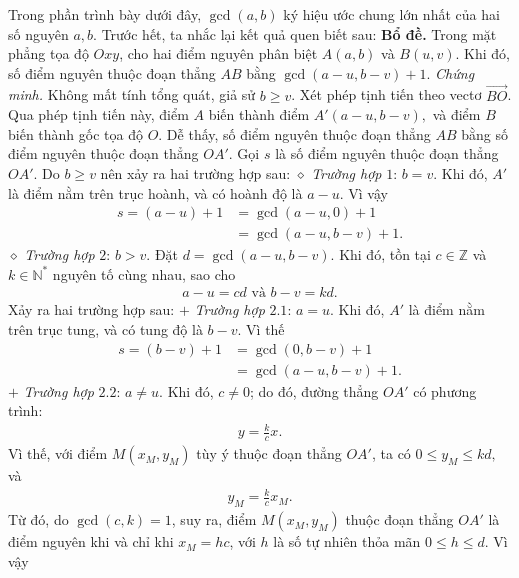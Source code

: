 \begin{multicols}{2}
	\vskip 0.05cm
	Trong phần trình bày dưới đây, $\gcd(a, b)$ ký hiệu ước chung lớn nhất của hai số nguyên $a, b$.\vskip 0.05cm
	Trước hết, ta nhắc lại kết quả quen biết sau:
	\vskip 0.05cm
	\textbf{\color{thachthuctoanhoc}Bổ đề.} Trong mặt phẳng tọa độ $Oxy$, cho hai điểm nguyên phân biệt $A(a, b)$ và $B(u, v)$. Khi đó, số điểm nguyên thuộc đoạn thẳng $AB$ bằng $\gcd(a - u, b - v) + 1$.
	\vskip 0.05cm
	\textit{Chứng minh.}
	\vskip 0.05cm
	Không mất tính tổng quát, giả sử $b \ge  v$.
	\vskip 0.05cm
	Xét phép tịnh tiến theo vectơ $\overrightarrow{BO}$. Qua phép tịnh tiến này, điểm $A$ biến thành điểm $A'\left( {a - u,b - v} \right),$  và điểm $B$ biến thành gốc tọa độ $O$. Dễ thấy, số điểm nguyên thuộc đoạn thẳng $AB$ bằng số điểm nguyên thuộc đoạn thẳng $OA'$.
	\vskip 0.05cm 
	Gọi $s$ là số điểm nguyên thuộc đoạn thẳng $OA'$.
	\vskip 0.05cm
	Do $b \ge  v$ nên xảy ra hai trường hợp sau:
	\vskip 0.05cm
	$\diamond$ \textit{Trường hợp} $1$: $b = v$.
	\vskip 0.05cm
	Khi đó, $A'$  là điểm nằm trên trục hoành, và có hoành độ là $a - u$. Vì vậy
	\begin{align*}
		s = (a - u) + 1 &= \gcd(a - u, 0) + 1 \\
		&= \gcd(a - u, b - v) + 1.
	\end{align*}
	$\diamond$ \textit{Trường hợp} $2$: $b > v$.
	\vskip 0.05cm
	Đặt $d = \gcd(a - u, b - v)$.
	\vskip 0.05cm
	Khi đó, tồn tại $c\in \mathbb{Z}$  và $k \in \mathbb{N^*}$  nguyên tố cùng nhau, sao cho
	\begin{align*}
		a - u = cd \text{ và } b - v = kd.
	\end{align*}
	Xảy ra hai trường hợp sau:
	\vskip 0.05cm
	$+$ \textit{Trường hợp} $2.1$: $a = u$.
	\vskip 0.05cm
	Khi đó, $A'$  là điểm nằm trên trục tung, và có tung độ là $b - v$. Vì thế
	\begin{align*}
		s = (b - v) + 1 &= \gcd(0, b - v) + 1 \\
		&= \gcd(a - u, b - v) + 1.
	\end{align*}
	$+$ \textit{Trường hợp} $2.2$: $a \ne u$.
	\vskip 0.05cm
	Khi đó, $c \ne 0$; do đó, đường thẳng $OA'$  có phương trình:
	\begin{align*}
		y = \frac{k}{c}x.
	\end{align*}
	Vì thế, với điểm $M\left( {{x_M},{y_M}} \right)$  tùy ý thuộc đoạn thẳng $OA'$,  ta có $0 \le {y_M} \le kd,$  và
	\begin{align*}
		{y_M} = \frac{k}{c}{x_M}.
	\end{align*}
	Từ đó, do $\gcd(c, k) = 1$, suy ra, điểm  $M\left( {{x_M},{y_M}} \right)$ thuộc đoạn thẳng  $OA'$ là điểm nguyên khi và chỉ khi $x_M = hc$,  với $h$ là số tự nhiên thỏa mãn $0 \le h \le d$. Vì vậy

\end{multicols}
